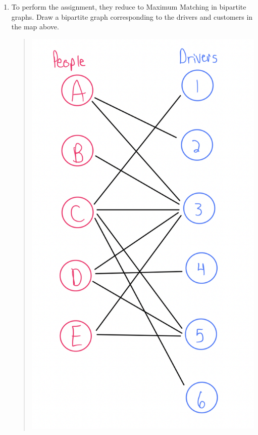 \documentclass[11pt]{article}
\begin{document}
\begin{enumerate}
    \begin{enumerate}
    \item To perform the assignment, they reduce to Maximum Matching in bipartite graphs.  Draw a bipartite graph corresponding to the drivers and customers in the map above.
     \begin{quote}
        \includegraphics[scale=0.4]{photos/q1a.png}
     \end{quote}


\end{enumerate}
\end{enumerate}
\end{document}
